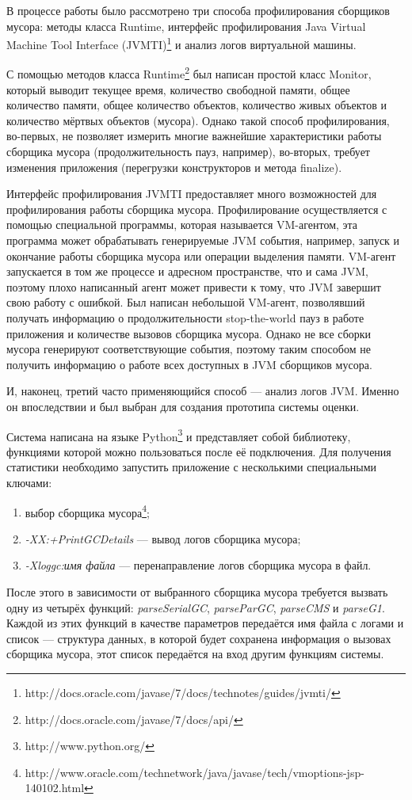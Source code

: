 В процессе работы было рассмотрено три способа профилирования сборщиков мусора:
методы класса Runtime, интерфейс профилирования Java Virtual Machine Tool Interface
(JVMTI)\footnote{http://docs.oracle.com/javase/7/docs/technotes/guides/jvmti/} и анализ
логов виртуальной машины.

С помощью методов класса Runtime\footnote{http://docs.oracle.com/javase/7/docs/api/}
был написан простой класс Monitor, который выводит текущее время, количество свободной памяти,
общее количество памяти, общее количество объектов, количество живых объектов и 
количество мёртвых объектов (мусора). Однако такой способ профилирования, во-первых,
не позволяет измерить многие важнейшие характеристики работы сборщика мусора (продолжительность
пауз, например), во-вторых, требует изменения приложения (перегрузки конструкторов и 
метода finalize).

Интерфейс профилирования JVMTI предоставляет много возможностей для профилирования
работы сборщика мусора. Профилирование осуществляется с помощью специальной программы,
которая называется VM-агентом, эта программа может обрабатывать генерируемые JVM
события, например, запуск и окончание работы сборщика мусора или операции выделения
памяти. VM-агент запускается в том же процессе и адресном пространстве, что и сама
JVM, поэтому плохо написанный агент может привести к тому, что JVM завершит свою
работу с ошибкой. Был написан небольшой VM-агент, позволявший получать информацию
о продолжительности stop-the-world пауз в работе приложения и количестве вызовов сборщика
мусора. Однако не все сборки мусора генерируют соответствующие события, поэтому таким способом не получить
информацию о работе всех доступных в JVM сборщиков мусора.

И, наконец, третий часто применяющийся способ --- анализ логов JVM. Именно он впоследствии
и был выбран для создания прототипа системы оценки.

Система написана на языке Python\footnote{http://www.python.org/} и представляет собой
библиотеку, функциями которой можно пользоваться после её подключения. Для получения
статистики необходимо запустить приложение с несколькими специальными ключами: 
\begin{enumerate}
\item выбор сборщика мусора\footnote{http://www.oracle.com/technetwork/java/javase/tech/vmoptions-jsp-140102.html};
\item \textit{-XX:+PrintGCDetails} --- вывод логов сборщика мусора;
\item \textit{-Xloggc:имя файла} --- перенаправление логов сборщика мусора в файл.
\end{enumerate}
После этого в зависимости от выбранного сборщика мусора требуется вызвать одну из
четырёх функций: \textit{parseSerialGC}, \textit{parseParGC}, \textit{parseCMS}
и \textit{parseG1}. Каждой из этих функций в качестве параметров передаётся имя файла 
с логами и список --- структура данных, в которой будет сохранена информация о
вызовах сборщика мусора, этот список передаётся на вход другим функциям системы.

